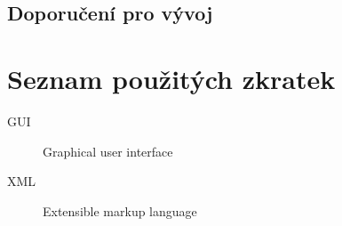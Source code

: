 \documentclass[thesis=M,czech]{FITthesis}[2012/06/26]
\begin{document}
\section{Doporučení pro vývoj}

\begin{conclusion}
\end{conclusion}




\appendix

\chapter{Seznam použitých zkratek}
\begin{description}
	\item[GUI] Graphical user interface
	\item[XML] Extensible markup language
\end{description}
\end{document}
